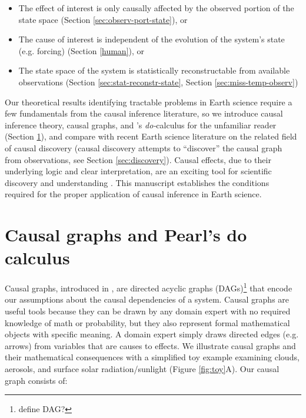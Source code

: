 \documentclass[12pt]{article}
\begin{document}
\begin{itemize}
\item The effect of interest is only causally affected by the observed
  portion of the state space (Section \ref{sec:observ-port-state}), or
\item The cause of interest is independent of the evolution of the
  system's state (e.g. forcing) (Section \ref{human}), or
\item The state space of the system is statistically reconstructable
  from available observations (Section \ref{sec:stat-reconstr-state},
  Section \ref{sec:miss-temp-observ})

\end{itemize}

Our theoretical results identifying tractable problems in Earth
science require a few fundamentals from the causal inference
literature, so we introduce causal inference theory, causal graphs,
and \citet{pearl2009}'s \textit{do-}calculus for the unfamiliar reader
(Section \ref{sec:causal-graphs-pearls}), and compare with recent
Earth science literature on the related field of causal discovery
(causal discovery attempts to ``discover'' the causal graph from
observations, see Section \ref{sec:discovery}). Causal effects, due to
their underlying logic and clear interpretation, are an exciting tool
for scientific discovery and understanding
\citep{hannart-da,naveau-2020}. This manuscript establishes the
conditions required for the proper application of causal inference in
Earth science.


\section{Causal graphs and Pearl's do calculus}
\label{sec:causal-graphs-pearls}

Causal graphs, introduced in \citet{pearl1995causal}, are directed
acyclic graphs (DAGs)\footnote{define DAG?} that encode our
assumptions about the causal dependencies of a system. Causal graphs
are useful tools because they can be drawn by any domain expert with
no required knowledge of math or probability, but they also represent
formal mathematical objects with specific meaning. A domain expert
simply draws directed edges (e.g. arrows) from variables that are
causes to effects. We illustrate causal graphs and their mathematical
consequences with a simplified toy example examining clouds, aerosols,
and surface solar radiation/sunlight (Figure \ref{fig:toy}A). Our
causal graph consists of:
\end{document}
